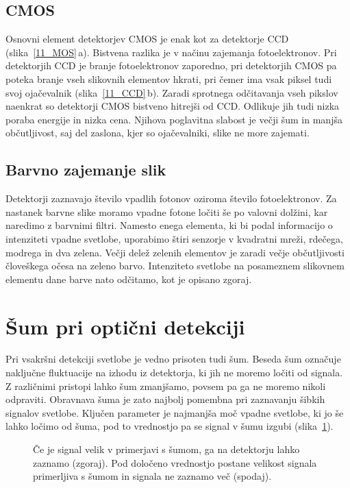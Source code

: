 \subsection*{CMOS}
Osnovni element detektorjev CMOS je enak kot za detektorje CCD (slika~\ref{11_MOS}\,a). 
Bistvena razlika je v načinu zajemanja fotoelektronov. Pri detektorjih CCD je branje 
fotoelektronov zaporedno, pri detektorjih CMOS pa poteka branje vseh slikovnih elementov 
hkrati, pri čemer ima vsak piksel tudi svoj ojačevalnik (slika~\ref{11_CCD}\,b).
Zaradi sprotnega odčitavanja vseh pikslov naenkrat so detektorji CMOS bistveno hitrejši 
od CCD. Odlikuje jih tudi nizka poraba energije in nizka cena. Njihova poglavitna slabost
je večji šum in manjša občutljivost, saj del zaslona, kjer so ojačevalniki, slike ne more
zajemati. 

\subsection*{Barvno zajemanje slik}
Detektorji zaznavajo število vpadlih fotonov oziroma število fotoelektronov.
Za nastanek barvne slike moramo vpadne fotone ločiti še po valovni dolžini, kar naredimo
z barvnimi filtri. Namesto enega elementa, ki bi podal informacijo o intenziteti vpadne 
svetlobe, uporabimo štiri senzorje v kvadratni mreži, rdečega, modrega in dva zelena. 
Večji delež zelenih elementov je zaradi večje občutljivosti človeškega očesa na zeleno barvo. 
Intenziteto svetlobe na posameznem slikovnem elementu dane barve nato odčitamo, kot je
opisano zgoraj.
 
\section{Šum pri optični detekciji}
Pri vsakršni detekciji svetlobe je vedno prisoten tudi šum. Beseda šum označuje naključne 
fluktuacije na izhodu iz detektorja, ki jih ne moremo ločiti od signala. Z različnimi 
pristopi lahko šum zmanjšamo, povsem pa ga ne moremo nikoli odpraviti. Obravnava 
šuma je zato najbolj pomembna pri zaznavanju šibkih signalov svetlobe. Ključen
parameter je najmanjša moč vpadne svetlobe, ki jo še lahko ločimo od šuma, pod to vrednostjo 
pa se signal v šumu izgubi (slika~\ref{11_sum}).
\begin{figure}[h]
\centering
\def\svgwidth{140truemm} 

\caption{Če je signal velik v primerjavi s šumom, ga na detektorju lahko zaznamo (zgoraj). 
Pod določeno vrednostjo postane velikost signala primerljiva s šumom in signala ne zaznamo več
(spodaj).}
\label{11_sum}
\end{figure}

